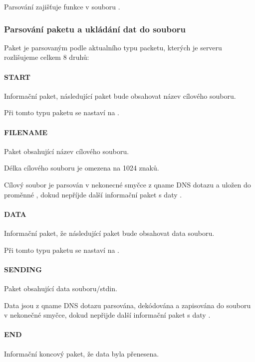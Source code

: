 Parsování zajišťuje funkce 
v souboru .

\subsubsection{Parsování paketu a ukládání dat do souboru} \label{sec:vytvareni-paketu-s}
Paket je parsovaným podle aktualního typu packetu, kterých je serveru
rozlišujeme celkem 8 druhů:

\paragraph{START}
Informační paket, následující paket bude obsahovat název cílového souboru.

Při tomto typu paketu se nastaví  na .

\paragraph{FILENAME}
Paket obsahující název cílového souboru.

Délka cílového souboru je omezena na 1024 znaků.

Cílový soubor je parsován v nekonecné smyčce z qname DNS dotazu
a uložen do proměnné , dokud nepříjde
další informační paket s daty .

\paragraph{DATA}
Informační paket, že následující paket bude obsahovat data souboru.

Při tomto typu paketu se nastaví  na .

\paragraph{SENDING}
Paket obsahující data souboru/stdin.

Data jsou z qname DNS dotazu parsována, dekódována a
zapisována do souboru v nekonečné smyčce, dokud nepřijde další
informační paket s daty .

\paragraph{END}
Informační koncový paket, že data byla přenesena.

